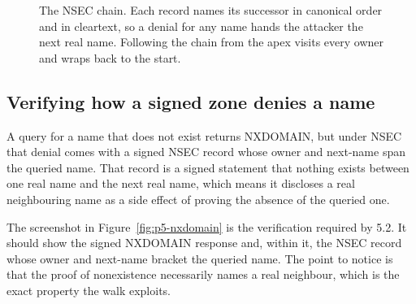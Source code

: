 \documentclass[11pt]{article}
\begin{document}
\begin{figure}[H]
\centering
{}
\caption{The NSEC chain. Each record names its successor in canonical order and in cleartext, so a denial for any name hands the attacker the next real name. Following the chain from the apex visits every owner and wraps back to the start.}
\label{fig:p5-nsec}
\end{figure}

\subsection{Verifying how a signed zone denies a name}

A query for a name that does not exist returns NXDOMAIN, but under NSEC that denial
comes with a signed NSEC record whose owner and next-name span the queried name.
That record is a signed statement that nothing exists between one real name and the
next real name, which means it discloses a real neighbouring name as a side effect
of proving the absence of the queried one.


The screenshot in Figure~\ref{fig:p5-nxdomain} is the verification required by 5.2.
It should show the signed NXDOMAIN response and, within it, the NSEC record whose
owner and next-name bracket the queried name. The point to notice is that the
proof of nonexistence necessarily names a real neighbour, which is the exact
property the walk exploits.
\end{document}
